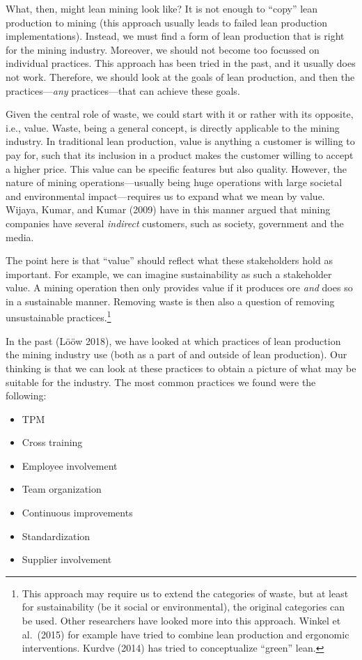 \documentclass[
  12pt,
]{scrbook}
\providecommand{\tightlist}{%
  \setlength{\itemsep}{0pt}\setlength{\parskip}{0pt}}
\begin{document}
What, then, might lean mining look like? It is not enough to ``copy'' lean production to mining (this approach usually leads to failed lean production implementations). Instead, we must find a form of lean production that is right for the mining industry. Moreover, we should not become too focussed on individual practices. This approach has been tried in the past, and it usually does not work. Therefore, we should look at the goals of lean production, and then the practices---\emph{any} practices---that can achieve these goals.

Given the central role of waste, we could start with it or rather with its opposite, i.e., value. Waste, being a general concept, is directly applicable to the mining industry. In traditional lean production, value is anything a customer is willing to pay for, such that its inclusion in a product makes the customer willing to accept a higher price. This value can be specific features but also quality. However, the nature of mining operations---usually being huge operations with large societal and environmental impact---requires us to expand what we mean by value. Wijaya, Kumar, and Kumar (2009) have in this manner argued that mining companies have several \emph{indirect} customers, such as society, government and the media.

The point here is that ``value'' should reflect what these stakeholders hold as important. For example, we can imagine sustainability as such a stakeholder value. A mining operation then only provides value if it produces ore \emph{and} does so in a sustainable manner. Removing waste is then also a question of removing unsustainable practices.\footnote{This approach may require us to extend the categories of waste, but at least for sustainability (be it social or environmental), the original categories can be used. Other researchers have looked more into this approach. Winkel et al.~(2015) for example have tried to combine lean production and ergonomic interventions. Kurdve (2014) has tried to conceptualize ``green'' lean.}

In the past (Lööw 2018), we have looked at which practices of lean production the mining industry use (both as a part of and outside of lean production). Our thinking is that we can look at these practices to obtain a picture of what may be suitable for the industry. The most common practices we found were the following:

\begin{itemize}
\tightlist
\item
  TPM
\item
  Cross training
\item
  Employee involvement
\item
  Team organization
\item
  Continuous improvements
\item
  Standardization
\item
  Supplier involvement
\end{itemize}
\end{document}
